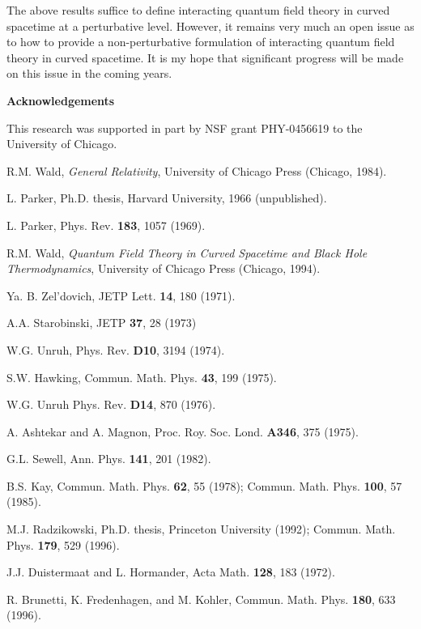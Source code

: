 The above results suffice to define interacting quantum field theory
in curved spacetime at a perturbative level. However, it remains very
much an open issue as to how to provide a non-perturbative formulation
of interacting quantum field theory in curved spacetime. It is my hope
that significant progress will be made on this issue in the coming years.

\bigskip 
\begin{center}
{\bf Acknowledgements} 
\end{center}
This research was supported in part by NSF grant PHY-0456619 to the
University of Chicago.

\begin{thebibliography}{99} 

 R.M. Wald, {\it General Relativity},
University of Chicago Press (Chicago, 1984).

 L. Parker, Ph.D. thesis, Harvard University, 1966 (unpublished).

 L. Parker, Phys. Rev. {\bf 183}, 1057 (1969).

 R.M. Wald, {\it Quantum Field Theory in Curved Spacetime and
Black Hole Thermodynamics}, University of Chicago Press (Chicago, 1994).

 Ya. B. Zel'dovich, JETP Lett. {\bf 14}, 180 (1971).

 A.A. Starobinski, JETP {\bf 37}, 28 (1973)

 W.G. Unruh, Phys. Rev. {\bf D10}, 3194 (1974).

 S.W. Hawking, Commun. Math. Phys. {\bf 43}, 199 (1975).

 W.G. Unruh Phys. Rev. {\bf D14}, 870 (1976).

 A. Ashtekar and A. Magnon, Proc. Roy. Soc. Lond. {\bf
A346}, 375 (1975).

 G.L. Sewell, Ann. Phys. {\bf 141}, 201 (1982).

 B.S. Kay, Commun. Math. Phys. {\bf 62}, 55 (1978);
Commun. Math. Phys. {\bf 100}, 57 (1985).

 M.J. Radzikowski, Ph.D. thesis, Princeton University (1992);
Commun. Math. Phys. {\bf 179}, 529 (1996).

 J.J. Duistermaat and L. Hormander, Acta Math. {\bf 128},
183 (1972).

 R. Brunetti, K. Fredenhagen, and M. Kohler,
Commun. Math. Phys. {\bf 180}, 633 (1996).


\end{thebibliography}
